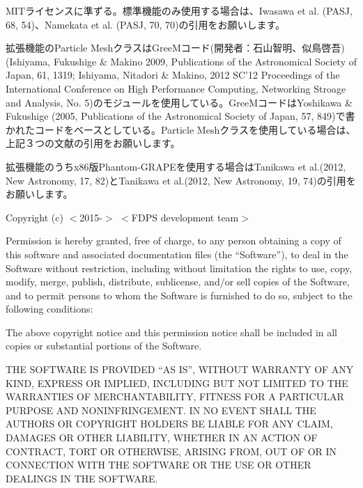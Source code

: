 MITライセンスに準ずる。標準機能のみ使用する場合は、Iwasawa et al. (PASJ, 68, 54)、Namekata et al. (PASJ, 70, 70)の引用をお願いします。

拡張機能のParticle MeshクラスはGreeMコード(開発者：石山智明、似鳥啓吾) (Ishiyama, Fukushige \& Makino 2009, Publications of the Astronomical Society of Japan, 61, 1319; Ishiyama, Nitadori \& Makino, 2012 SC'12 Proceedings of the International Conference on High Performance Computing, Networking Stroage and Analysis, No. 5)のモジュールを使用している。GreeMコードはYoshikawa \& Fukushige (2005, Publications of the Astronomical Society of Japan, 57, 849)で書かれたコードをベースとしている。Particle Meshクラスを使用している場合は、上記３つの文献の引用をお願いします。

拡張機能のうちx86版Phantom-GRAPEを使用する場合はTanikawa et al.(2012, New Astronomy, 17, 82)とTanikawa et al.(2012, New Astronomy, 19, 74)の引用をお願いします。

\vspace{5mm}

Copyright (c) $<$2015-$>$ $<$FDPS development team$>$

\vspace{3mm}

Permission is hereby granted, free of charge, to any person obtaining a copy of this software and associated documentation files (the ``Software''), to deal in the Software without restriction, including without limitation the rights to use, copy, modify, merge, publish, distribute, sublicense, and/or sell copies of the Software, and to permit persons to whom the Software is furnished to do so, subject to the following conditions:

\vspace{3mm}

The above copyright notice and this permission notice shall be included in all copies or substantial portions of the Software.

\vspace{3mm}

THE SOFTWARE IS PROVIDED ``AS IS'', WITHOUT WARRANTY OF ANY KIND, EXPRESS OR IMPLIED, INCLUDING BUT NOT LIMITED TO THE WARRANTIES OF MERCHANTABILITY, FITNESS FOR A PARTICULAR PURPOSE AND NONINFRINGEMENT. IN NO EVENT SHALL THE AUTHORS OR COPYRIGHT HOLDERS BE LIABLE FOR ANY CLAIM, DAMAGES OR OTHER LIABILITY, WHETHER IN AN ACTION OF CONTRACT, TORT OR OTHERWISE, ARISING FROM, OUT OF OR IN CONNECTION WITH THE SOFTWARE OR THE USE OR OTHER DEALINGS IN THE SOFTWARE.
